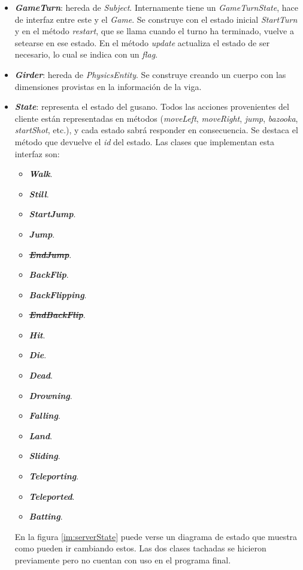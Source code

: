 \begin{itemize}
	\item \textbf{\textit{GameTurn}}: hereda de \textit{Subject}. Internamente tiene un \textit{GameTurnState}, hace de interfaz entre este y el \textit{Game}. Se construye con el estado inicial \textit{StartTurn} y en el método \textit{restart}, que se llama cuando el turno ha terminado, vuelve a setearse en ese estado. En el método \textit{update} actualiza el estado de ser necesario, lo cual se indica con un \textit{flag}.
	
	\item \textbf{\textit{Girder}}: hereda de \textit{PhysicsEntity}. Se construye creando un cuerpo con las dimensiones provistas en la información de la viga.
	
	\item \textbf{\textit{State}}: representa el estado del gusano. Todos las acciones provenientes del cliente están representadas en métodos (\textit{moveLeft}, \textit{moveRight}, \textit{jump}, \textit{bazooka}, \textit{startShot}, etc.), y cada estado sabrá responder en consecuencia. Se destaca el método que devuelve el \textit{id} del estado. Las clases que implementan esta interfaz son:
	\begin{itemize}
		\item \textbf{\textit{Walk}}.
		\item \textbf{\textit{Still}}.
		\item \textbf{\textit{StartJump}}.
		\item \textbf{\textit{Jump}}.
		\item \textbf{\textit{\sout{EndJump}}}.
		\item \textbf{\textit{BackFlip}}.
		\item \textbf{\textit{BackFlipping}}.
		\item \textbf{\textit{\sout{EndBackFlip}}}.
		\item \textbf{\textit{Hit}}.
		\item \textbf{\textit{Die}}.
		\item \textbf{\textit{Dead}}.
		\item \textbf{\textit{Drowning}}.
		\item \textbf{\textit{Falling}}.
		\item \textbf{\textit{Land}}.
		\item \textbf{\textit{Sliding}}.
		\item \textbf{\textit{Teleporting}}.
		\item \textbf{\textit{Teleported}}.
		\item \textbf{\textit{Batting}}.
	\end{itemize}
	En la figura \ref{im:serverState} puede verse un diagrama de estado que muestra como pueden ir cambiando estos. Las dos clases tachadas se hicieron previamente pero no cuentan con uso en el programa final.
	

\end{itemize}
